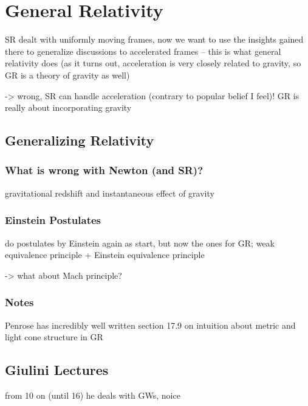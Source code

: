 




\chapter{General Relativity}

SR dealt with uniformly moving frames, now we want to use the insights gained there to generalize discussions to accelerated frames -- this is what general relativity does (as it turns out, acceleration is very closely related to gravity, so GR is a theory of gravity as well)

-> wrong, SR can handle acceleration (contrary to popular belief I feel)! GR is really about incorporating gravity




	\section{Generalizing Relativity}
		\subsection{What is wrong with Newton (and SR)?}
gravitational redshift and instantaneous effect of gravity



		\subsection{Einstein Postulates}
do postulates by Einstein again as start, but now the ones for GR; weak equivalence principle + Einstein equivalence principle

-> what about Mach principle?


		\subsection{Notes}
Penrose has incredibly well written section 17.9 on intuition about metric and light cone structure in GR



\newpage



	\section{Giulini Lectures}
from 10 on (until 16) he deals with GWs, noice



